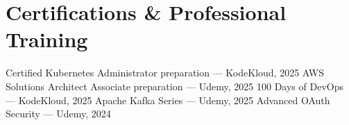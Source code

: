 \section*{Certifications \& Professional Training} 
\BigDivider 
\small \newline
Certified Kubernetes Administrator preparation --- KodeKloud, 2025 \textbullet{} 
AWS Solutions Architect Associate preparation --- Udemy, 2025 \textbullet{} 
100 Days of DevOps --- KodeKloud, 2025 \textbullet{} 
Apache Kafka Series --- Udemy, 2025 \textbullet{} 
Advanced OAuth Security --- Udemy, 2024 
\normalsize 
